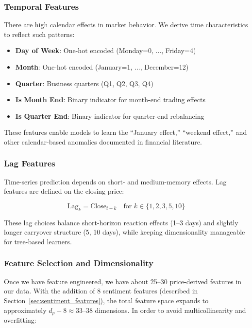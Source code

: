 \documentclass[12pt,a4paper]{article}
\begin{document}
\subsubsection{Temporal Features}

There are high calendar effects in market behavior. We derive time characteristics to reflect such patterns:

\begin{itemize}
    \item \textbf{Day of Week}: One-hot encoded (Monday=0, ..., Friday=4)
    \item \textbf{Month}: One-hot encoded (January=1, ..., December=12)
    \item \textbf{Quarter}: Business quarters (Q1, Q2, Q3, Q4)
    \item \textbf{Is Month End}: Binary indicator for month-end trading effects
    \item \textbf{Is Quarter End}: Binary indicator for quarter-end rebalancing
\end{itemize}

These features enable models to learn the ``January effect,'' ``weekend effect,'' and other calendar-based anomalies documented in financial literature.

\subsubsection{Lag Features}

Time-series prediction depends on short- and medium-memory effects. Lag features are defined on the closing price:

\begin{equation}
\text{Lag}_k = \text{Close}_{t-k} \quad \text{for } k \in \{1, 2, 3, 5, 10\}
\end{equation}

These lag choices balance short-horizon reaction effects (1--3 days) and slightly longer carryover structure (5, 10 days), while keeping dimensionality manageable for tree-based learners.

\subsubsection{Feature Selection and Dimensionality}

Once we have feature engineered, we have about 25--30 price-derived features in our data. With the addition of 8 sentiment features (described in Section~\ref{sec:sentiment_features}), the total feature space expands to approximately $d_p + 8 \approx 33$--$38$ dimensions. In order to avoid multicollinearity and overfitting:
\end{document}
